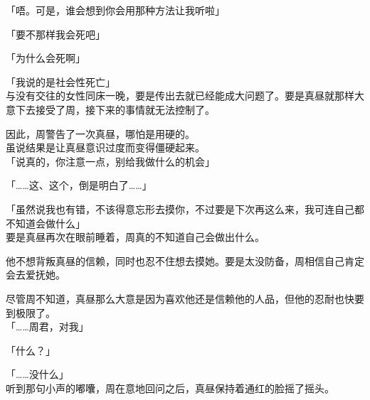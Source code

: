 「唔。可是，谁会想到你会用那种方法让我听啦」

「要不那样我会死吧」

「为什么会死啊」

「我说的是社会性死亡」\\

与没有交往的女性同床一晚，要是传出去就已经能成大问题了。要是真昼就那样大意下去接受了周，接下来的事情就无法控制了。

因此，周警告了一次真昼，哪怕是用硬的。\\

虽说结果是让真昼意识过度而变得僵硬起来。\\

「说真的，你注意一点，别给我做什么的机会」

「……这、这个，倒是明白了……」

「虽然说我也有错，不该得意忘形去摸你，不过要是下次再这么来，我可连自己都不知道会做什么」\\

要是真昼再次在眼前睡着，周真的不知道自己会做出什么。

他不想背叛真昼的信赖，同时也忍不住想去摸她。要是太没防备，周相信自己肯定会去爱抚她。

尽管周不知道，真昼那么大意是因为喜欢他还是信赖他的人品，但他的忍耐也快要到极限了。\\

「……周君，对我」

「什么？」

「……没什么」\\

听到那句小声的嘟囔，周在意地回问之后，真昼保持着通红的脸摇了摇头。
